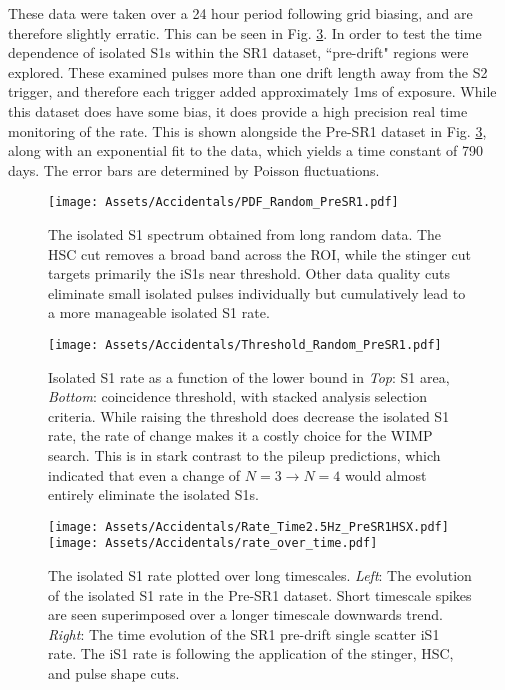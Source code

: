 These data were taken over a 24 hour period following grid biasing, and are therefore slightly erratic.
This can be seen in Fig. \ref{fig:presr1-trend}.
In order to test the time dependence of isolated S1s within the SR1 dataset, ``pre-drift" regions were explored.
These examined pulses more than one drift length away from the S2 trigger, and therefore each trigger added approximately 1ms of exposure.
While this dataset does have some bias, it does provide a high precision real time monitoring of the rate.
This is shown alongside the Pre-SR1 dataset in Fig. \ref{fig:presr1-trend}, along with an exponential fit to the data, which yields a time constant of 790 days.
The error bars are determined by Poisson fluctuations.

\begin{figure}
    \centering
    \texttt{[image: Assets/Accidentals/PDF\_Random\_PreSR1.pdf]}
    \caption[The isolated S1 spectrum obtained from long random data.]%
    {The isolated S1 spectrum obtained from long random data.
    The HSC cut  removes a broad band across the ROI, while the stinger cut targets primarily the iS1s near threshold.
    Other data quality cuts eliminate small isolated pulses individually but cumulatively lead to a more manageable isolated S1 rate.}
    \label{fig:presr1-longrandom-pdf}
\end{figure}

\begin{figure}
    \centering
    \texttt{[image: Assets/Accidentals/Threshold\_Random\_PreSR1.pdf]}
    \caption[Isolated S1 rate as a function of the lower bound in \textit{Top}: S1 area, \textit{Bottom}: coincidence threshold, with stacked analysis selection criteria.]%
    {Isolated S1 rate as a function of the lower bound in \textit{Top}: S1 area, \textit{Bottom}: coincidence threshold, with stacked analysis selection criteria.
    While raising the threshold does decrease the isolated S1 rate, the rate of change makes it a costly choice for the WIMP search. 
    This is in stark contrast to the pileup predictions, which indicated that even a change of $N=3 \rightarrow N=4$ would almost entirely eliminate the isolated S1s.}
    \label{fig:presr1-threshold}
\end{figure}

\begin{figure}
    \centering
    \texttt{[image: Assets/Accidentals/Rate\_Time2.5Hz\_PreSR1HSX.pdf]}
    \texttt{[image: Assets/Accidentals/rate\_over\_time.pdf]}
    \caption[The isolated S1 rate plotted over long timescales.]%
    {
    The isolated S1 rate plotted over long timescales.
    \textit{Left}: The evolution of the isolated S1 rate in the Pre-SR1 dataset. Short timescale spikes are seen superimposed over a longer timescale downwards trend.
    \textit{Right}: The time evolution of the SR1 pre-drift single scatter iS1 rate. The  iS1 rate is following the application of the stinger, HSC, and pulse shape cuts.}
    \label{fig:presr1-trend}
\end{figure}
